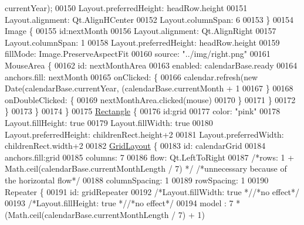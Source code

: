 \begin{DoxyCode}
{{{      currentYear);
00150                     Layout.preferredHeight: headRow.height
00151                     Layout.alignment: Qt.AlignHCenter
00152                     Layout.columnSpan: 6
00153                 \}
00154                 Image \{
00155                     \textcolor{keywordtype}{id}:nextMonth
00156                     Layout.alignment: Qt.AlignRight
00157                     Layout.columnSpan: 1
00158                     Layout.preferredHeight: headRow.height
00159                     fillMode: Image.PreserveAspectFit
00160                     source: \textcolor{stringliteral}{"../img/right.png"}
00161                     MouseArea \{
00162                         \textcolor{keywordtype}{id}:  nextMonthArea
00163                         enabled: calendarBase.ready
00164                         anchors.fill: nextMonth
00165                         onClicked: \{
00166                             calendar.refresh(\textcolor{keyword}{new} Date(calendarBase.currentYear, (calendarBase.currentMonth 
      + 1 %
00167                         \}
00168                         onDoubleClicked: \{
00169                             nextMonthArea.clicked(mouse)
00170                         \}
00171                     \}
00172                 \}
00173             \}
00174         \}
00175         \hyperlink{classRectangle}{Rectangle} \{
00176             \textcolor{keywordtype}{id}:grid
00177             color: \textcolor{stringliteral}{"pink"}
00178             Layout.fillHeight: \textcolor{keyword}{true}
00179             Layout.fillWidth: \textcolor{keyword}{true}
00180             Layout.preferredHeight: childrenRect.height+2
00181             Layout.preferredWidth: childrenRect.width+2
00182             \hyperlink{classGridLayout}{GridLayout} \{
00183                 \textcolor{keywordtype}{id}: calendarGrid
00184                 anchors.fill:grid
00185                 columns: 7
00186                 flow: Qt.LeftToRight
00187                 \textcolor{comment}{/*rows: 1 + Math.ceil(calendarBase.currentMonthLength / 7) */} \textcolor{comment}{/*unnecessary because of the
       horizontal flow*/}
00188                 columnSpacing: 1
00189                 rowSpacing: 1
00190                 Repeater \{
00191                     \textcolor{keywordtype}{id}: gridRepeater
00192                     \textcolor{comment}{/*Layout.fillWidth: true */}\textcolor{comment}{/*no effect*/}
00193                     \textcolor{comment}{/*Layout.fillHeight: true */}\textcolor{comment}{/*no effect*/}
00194                     model : 7 * (Math.ceil(calendarBase.currentMonthLength / 7) + 1)
}}}
\end{DoxyCode}
